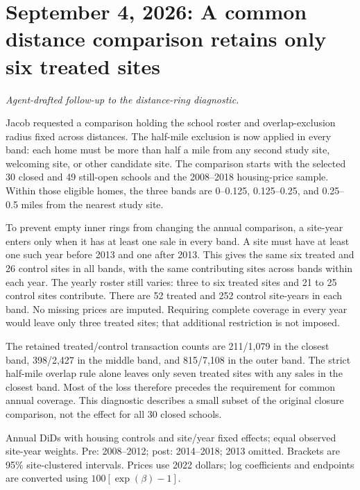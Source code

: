 \section*{September 4, 2026: A common distance comparison retains only six treated sites}
\textit{Agent-drafted follow-up to the distance-ring diagnostic.}

Jacob requested a comparison holding the school roster and overlap-exclusion
radius fixed across distances. The half-mile exclusion is now applied in
every band: each home must be more than half a mile from any second study
site, welcoming site, or other candidate site. The comparison starts with the
selected 30 closed and 49 still-open schools
and the 2008--2018 housing-price sample. Within those eligible homes, the
three bands are 0--0.125, 0.125--0.25, and 0.25--0.5 miles from the nearest
study site.

To prevent empty inner rings from changing the annual comparison, a
site-year enters only when it has at least one sale in every band. A site
must have at least one such year before 2013 and one after 2013. This gives
the same six treated and 26 control sites in all bands, with the same
contributing sites across bands within each year. The yearly roster still
varies: three to six treated sites and 21 to 25 control sites contribute.
There are 52 treated and 252 control site-years in each band. No missing
prices are imputed. Requiring complete coverage in every year would leave
only three treated sites; that additional restriction is not imposed.

The retained treated/control transaction counts are 211/1,079 in the closest
band, 398/2,427 in the middle band, and 815/7,108 in the outer band. The strict
half-mile overlap rule alone leaves only seven treated sites with any sales
in the closest band. Most of the loss therefore precedes the requirement
for common annual coverage. This diagnostic describes a small subset of the
original closure comparison, not the effect for all 30 closed schools.

\begin{center}
\scriptsize

\end{center}
{\footnotesize Annual DiDs with housing controls and site/year fixed effects;
equal observed site-year weights. Pre: 2008--2012; post: 2014--2018; 2013
omitted. Brackets are 95\% site-clustered intervals. Prices use 2022 dollars;
log coefficients and endpoints are converted using $100[\exp(\beta)-1]$.}

